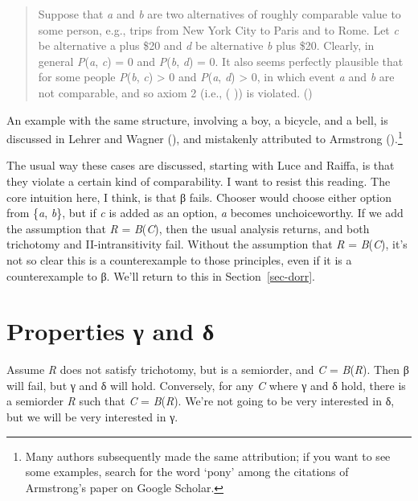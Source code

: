 \documentclass[
  11pt,
  letterpaper,
  DIV=11,
  numbers=noendperiod,
  twoside]{scrartcl}
\begin{document}
\begin{quote}
Suppose that \emph{a} and \emph{b} are two alternatives of roughly
comparable value to some person, e.g., trips from New York City to Paris
and to Rome. Let \emph{c} be alternative a plus \$20 and \emph{d} be
alternative \emph{b} plus \$20. Clearly, in general \emph{P}(\emph{a},
\emph{c}) = 0 and \emph{P}(\emph{b}, \emph{d}) = 0. It also seems
perfectly plausible that for some people \emph{P}(\emph{b}, \emph{c})
\textgreater{} 0 and \emph{P}(\emph{a}, \emph{d}) \textgreater{} 0, in
which event \emph{a} and \emph{b} are not comparable, and so axiom 2
(i.e., ( )) is violated.
()
\end{quote}

An example with the same structure, involving a boy, a bicycle, and a
bell, is discussed in Lehrer and Wagner
(), and mistakenly attributed to
Armstrong ().\footnote{Many authors
  subsequently made the same attribution; if you want to see some
  examples, search for the word `pony' among the citations of
  Armstrong's paper on Google Scholar.}

The usual way these cases are discussed, starting with Luce and Raiffa,
is that they violate a certain kind of comparability. I want to resist
this reading. The core intuition here, I think, is that β fails. Chooser
would choose either option from \{\emph{a}, \emph{b}\}, but if \emph{c}
is added as an option, \emph{a} becomes unchoiceworthy. If we add the
assumption that \emph{R} = \emph{B}(\emph{C}), then the usual analysis
returns, and both trichotomy and II-intransitivity fail. Without the
assumption that \emph{R} = \emph{B}(\emph{C}), it's not so clear this is
a counterexample to those principles, even if it is a counterexample to
β. We'll return to this in Section~\ref{sec-dorr}.

\section{Properties γ and δ}\label{sec-gamma}

Assume \emph{R} does not satisfy trichotomy, but is a semiorder, and
\emph{C} = \emph{B}(\emph{R}). Then β will fail, but γ and δ will hold.
Conversely, for any \emph{C} where γ and δ hold, there is a semiorder
\emph{R} such that \emph{C} = \emph{B}(\emph{R}). We're not going to be
very interested in δ, but we will be very interested in γ.
\end{document}
